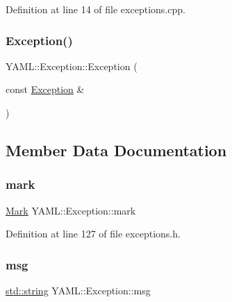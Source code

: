 Definition at line 14 of file exceptions.\+cpp.

\mbox{\label{class_y_a_m_l_1_1_exception_a197a81d38440637a7589e94a1b41929a}} 
\subsubsection{\texorpdfstring{Exception()}{Exception()}\hspace{0.1cm}{\footnotesize\ttfamily [2/2]}}
{\footnotesize\ttfamily Y\+A\+M\+L\+::\+Exception\+::\+Exception (\begin{DoxyParamCaption}\item[{const \mbox{\hyperlink{class_y_a_m_l_1_1_exception}{Exception}} \&}]{ }\end{DoxyParamCaption})\hspace{0.3cm}{\ttfamily [default]}}



\subsection{Member Data Documentation}
\mbox{\label{class_y_a_m_l_1_1_exception_aae9d515164d1ff4bbc26aee3abe073fa}} 
\subsubsection{\texorpdfstring{mark}{mark}}
{\footnotesize\ttfamily \mbox{\hyperlink{struct_y_a_m_l_1_1_mark}{Mark}} Y\+A\+M\+L\+::\+Exception\+::mark}



Definition at line 127 of file exceptions.\+h.

\mbox{\label{class_y_a_m_l_1_1_exception_a5de66d8f62317e66d2f2c4386b325d29}} 
\subsubsection{\texorpdfstring{msg}{msg}}
{\footnotesize\ttfamily \mbox{\hyperlink{glad_8h_ac83513893df92266f79a515488701770}{std\+::string}} Y\+A\+M\+L\+::\+Exception\+::msg}



